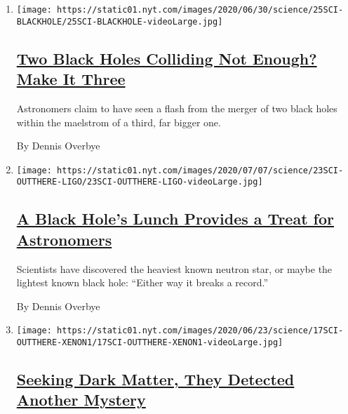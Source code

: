 \begin{enumerate}
\def\labelenumi{\arabic{enumi}.}
\item
  \texttt{[image: https://static01.nyt.com/images/2020/06/30/science/25SCI-BLACKHOLE/25SCI-BLACKHOLE-videoLarge.jpg]}

  \hypertarget{two-black-holes-colliding-not-enough-make-it-three}{%
  \subsection{\texorpdfstring{\href{/2020/06/25/science/black-hole-collision-ligo.html}{Two
  Black Holes Colliding Not Enough? Make It
  Three}}{Two Black Holes Colliding Not Enough? Make It Three}}\label{two-black-holes-colliding-not-enough-make-it-three}}

  Astronomers claim to have seen a flash from the merger of two black
  holes within the maelstrom of a third, far bigger one.

  By Dennis Overbye
\item
  \texttt{[image: https://static01.nyt.com/images/2020/07/07/science/23SCI-OUTTHERE-LIGO/23SCI-OUTTHERE-LIGO-videoLarge.jpg]}

  \hypertarget{a-black-holes-lunch-provides-a-treat-for-astronomers}{%
  \subsection{\texorpdfstring{\href{/2020/06/24/science/black-hole-ligo-gravitational.html}{A
  Black Hole's Lunch Provides a Treat for
  Astronomers}}{A Black Hole's Lunch Provides a Treat for Astronomers}}\label{a-black-holes-lunch-provides-a-treat-for-astronomers}}

  Scientists have discovered the heaviest known neutron star, or maybe
  the lightest known black hole: ``Either way it breaks a record.''

  By Dennis Overbye
\item
  \texttt{[image: https://static01.nyt.com/images/2020/06/23/science/17SCI-OUTTHERE-XENON1/17SCI-OUTTHERE-XENON1-videoLarge.jpg]}

  \hypertarget{seeking-dark-matter-they-detected-another-mystery}{%
  \subsection{\texorpdfstring{\href{/2020/06/17/science/xenon-axions-neutrinos-tritium.html}{Seeking
  Dark Matter, They Detected Another
  Mystery}}{Seeking Dark Matter, They Detected Another Mystery}}\label{seeking-dark-matter-they-detected-another-mystery}}


\end{enumerate}
